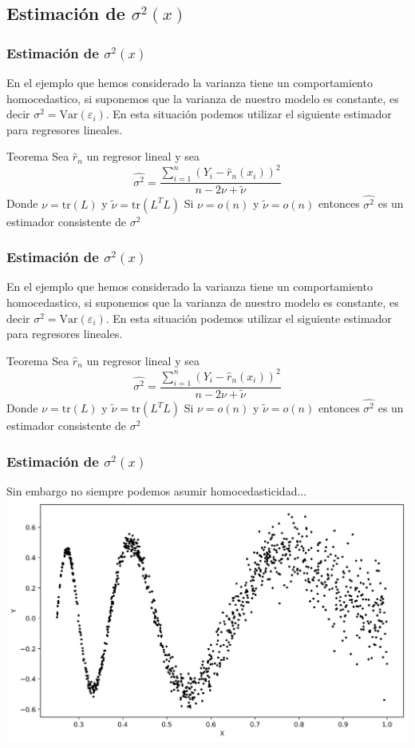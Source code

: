 \documentclass[aspectratio=169,spanish]{beamer}
\begin{document}
\begin{frame}
\section{Estimación de $\sigma^{2}(x)$}
\frametitle{Estimación de $\sigma^{2}(x)$}
En el ejemplo que hemos considerado la varianza tiene un comportamiento homocedastico, si suponemos que la varianza de nuestro modelo es constante, es decir $\sigma^2=\text{Var}(\varepsilon_i)$. En esta situación podemos utilizar el siguiente estimador para regresores lineales. 
\begin{block}{Teorema}
Sea $\hat{r}_n$ un regresor lineal y sea $$\hat{\sigma^2}=\frac{\sum_{i=1}^{n}(Y_i-\hat{r}_n(x_i))^2}{n-2\nu+\tilde{\nu}}$$
Donde $\nu = \text{tr}(L)$ y $\tilde{\nu} = \text{tr}(L^T L)$
Si $\nu = o(n)$ y $\tilde{\nu} =o(n)$ entonces $\hat{\sigma^2}$ es un estimador consistente de $\sigma^2$
\end{block}
\end{frame}



\begin{frame}
\frametitle{Estimación de $\sigma^{2}(x)$}
En el ejemplo que hemos considerado la varianza tiene un comportamiento homocedastico, si suponemos que la varianza de nuestro modelo es constante, es decir $\sigma^2=\text{Var}(\varepsilon_i)$. En esta situación podemos utilizar el siguiente estimador para regresores lineales. 
\begin{block}{Teorema}
Sea $\hat{r}_n$ un regresor lineal y sea $$\hat{\sigma^2}=\frac{\sum_{i=1}^{n}(Y_i-\hat{r}_n(x_i))^2}{n-2\nu+\tilde{\nu}}$$
Donde $\nu = \text{tr}(L)$ y $\tilde{\nu} = \text{tr}(L^T L)$
Si $\nu = o(n)$ y $\tilde{\nu} =o(n)$ entonces $\hat{\sigma^2}$ es un estimador consistente de $\sigma^2$
\end{block}
\end{frame}

\begin{frame}
\frametitle{Estimación de $\sigma^{2}(x)$}
Sin embargo no siempre podemos asumir homocedasticidad...
\center
\includegraphics[scale=0.5]{regresionvar}
\end{frame}
\end{document}
